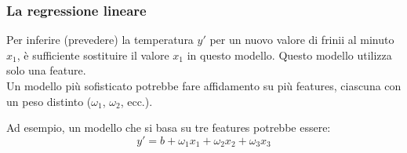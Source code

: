 \begin{frame}

	\frametitle{La regressione lineare}

	\begin{block}{}
		Per inferire (prevedere) la temperatura $y'$ per un nuovo valore di frinii al minuto $x_1$, è sufficiente sostituire il valore $x_1$ in questo modello.
		\newlinedouble
		Questo modello utilizza solo una feature.\\
		Un modello più sofisticato potrebbe fare affidamento su più features, ciascuna con un peso distinto ($\omega_1$, $\omega_2$, ecc.).
		\newlinedouble

		Ad esempio, un modello che si basa su tre features potrebbe essere:
		$$y' = b + \omega_1x_1 + \omega_2x_2 + \omega_3x_3$$
		\vspace{0.1mm}
	\end{block}

\end{frame}
